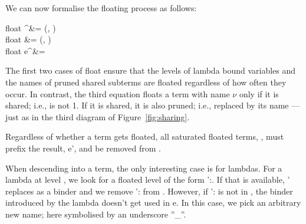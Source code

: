 We can now formalise the floating process as follows:
%
\begin{haskell}
  float \Omega \ell^\nu      &= (\float{}\ell,  \underline\nu)\\
  float \Omega \underline\nu &= (\float{}\cdot, \underline\nu)\\
  float \Omega e^\nu         &= 
\end{haskell}
%
The first two cases of \<float\> ensure that the levels of lambda bound variables and the names of pruned shared subterms are floated regardless of how often they occur. In contrast, the third equation floats a term with name $\nu$ only if it is shared; i.e., \<\Omega\nu\> is not 1. If it is shared, it is also pruned; i.e., replaced by its name \<\underline\nu\> --- just as in the third diagram of Figure~\ref{fig:sharing}.

Regardless of whether a term gets floated, all saturated floated terms, \<\>, must prefix the result, \<e'\>, and be removed from \<\overline\Gamma\>.

When \<descend\>ing into a term, the only interesting case is for lambdas. For a lambda at level \<\ell\>, we look for a floated level of the form \<\nu':\ell\>. If that is available, \<\nu'\> replaces \<\ell\> as a binder and we remove \<\nu':\ell\> from \<\overline\Gamma\>. However, if \<\nu':\ell\> is not in \<\overline\Gamma\>, the binder introduced by the lambda doesn't get used in \<e\>. In this case, we pick an arbitrary new name; here symbolised by an underscore ''\<\_\>''.


